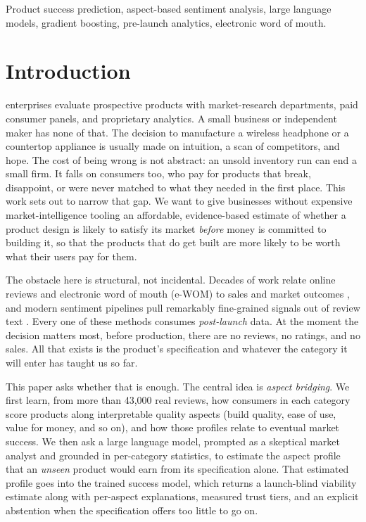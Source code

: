 \documentclass[journal]{IEEEtran}
\begin{document}
\begin{IEEEkeywords}
Product success prediction, aspect-based sentiment analysis, large language models, gradient boosting, pre-launch analytics, electronic word of mouth.
\end{IEEEkeywords}

\section{Introduction}
 enterprises evaluate prospective products with market-research departments, paid consumer panels, and proprietary analytics. A small business or independent maker has none of that. The decision to manufacture a wireless headphone or a countertop appliance is usually made on intuition, a scan of competitors, and hope. The cost of being wrong is not abstract: an unsold inventory run can end a small firm. It falls on consumers too, who pay for products that break, disappoint, or were never matched to what they needed in the first place. This work sets out to narrow that gap. We want to give businesses without expensive market-intelligence tooling an affordable, evidence-based estimate of whether a product design is likely to satisfy its market \emph{before} money is committed to building it, so that the products that do get built are more likely to be worth what their users pay for them.

The obstacle here is structural, not incidental. Decades of work relate online reviews and electronic word of mouth (e-WOM) to sales and market outcomes \cite{chevalier2006wom,dellarocas2003digitization,chintagunta2010effects,luca2016reviews}, and modern sentiment pipelines pull remarkably fine-grained signals out of review text \cite{zhang2022survey,wang2025multifeature,shan2025bilingual}. Every one of these methods consumes \emph{post-launch} data. At the moment the decision matters most, before production, there are no reviews, no ratings, and no sales. All that exists is the product's specification and whatever the category it will enter has taught us so far.

This paper asks whether that is enough. The central idea is \emph{aspect bridging}. We first learn, from more than 43{,}000 real reviews, how consumers in each category score products along interpretable quality aspects (build quality, ease of use, value for money, and so on), and how those profiles relate to eventual market success. We then ask a large language model, prompted as a skeptical market analyst and grounded in per-category statistics, to estimate the aspect profile that an \emph{unseen} product would earn from its specification alone. That estimated profile goes into the trained success model, which returns a launch-blind viability estimate along with per-aspect explanations, measured trust tiers, and an explicit abstention when the specification offers too little to go on.
\end{document}
